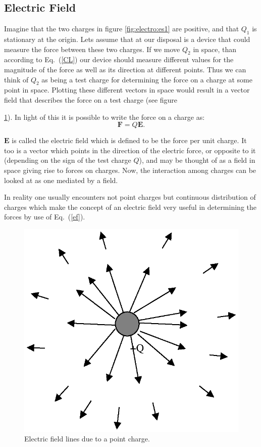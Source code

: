 \subsection{Electric Field}
Imagine that the two charges in figure \ref{fig:electro:es1} are positive, and
that $Q_1$ is stationary at the origin.  Lets assume that at our
disposal is a device that could measure the force between these
two charges. If we move $Q_2$ in space, than according to
Eq.~(\ref{CL}) our device should measure different values for the
magnitude of the force as well as its direction at different
points. Thus we can think of $Q_2$ as being a test charge for
determining the force on a charge at some point in space. Plotting
these different vectors in space would result in a vector field
that describes the force on a test charge (see figure {\ref{es2}).
In light of this it is possible to write the force on a charge as:
\begin{equation}
{\mathbf{F}}=Q{\mathbf{E}}\label{ef}.
\end{equation}

$\mathbf{E}$ is called the electric field which is defined to be
the force per unit charge.  It too is a vector which points in the
direction of the electric force, or opposite to it (depending on the sign of the test charge $Q$), and may be thought of as a field
in space giving rise to forces on charges.  Now, the interaction
among charges can be looked at as one mediated by a field.

In reality one usually encounters not point charges but
continuous distribution of charges which make the concept of an
electric field very useful in determining the forces by use of
Eq.~(\ref{ef}).
\begin{figure}[!htb]
\centering
\epsfxsize=6cm \includegraphics[scale=0.4]{1_electrostatics/es2.eps}
\caption{Electric field lines due to a point charge.}
 \label{es2}
\end{figure}

}
